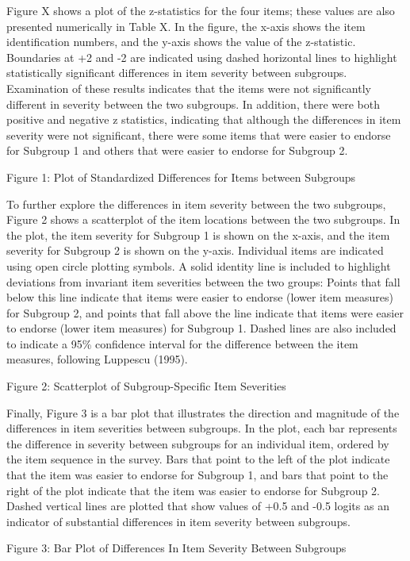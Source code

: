 \documentclass[
]{article}
\begin{document}
Figure X shows a plot of the z-statistics for the four items; these values are also presented numerically in Table X. In the figure, the x-axis shows the item identification numbers, and the y-axis shows the value of the z-statistic. Boundaries at +2 and -2 are indicated using dashed horizontal lines to highlight statistically significant differences in item severity between subgroups. Examination of these results indicates that the items were not significantly different in severity between the two subgroups. In addition, there were both positive and negative z statistics, indicating that although the differences in item severity were not significant, there were some items that were easier to endorse for Subgroup 1 and others that were easier to endorse for Subgroup 2.

Figure 1: Plot of Standardized Differences for Items between Subgroups

To further explore the differences in item severity between the two subgroups, Figure 2 shows a scatterplot of the item locations between the two subgroups. In the plot, the item severity for Subgroup 1 is shown on the x-axis, and the item severity for Subgroup 2 is shown on the y-axis. Individual items are indicated using open circle plotting symbols. A solid identity line is included to highlight deviations from invariant item severities between the two groups: Points that fall below this line indicate that items were easier to endorse (lower item measures) for Subgroup 2, and points that fall above the line indicate that items were easier to endorse (lower item measures) for Subgroup 1. Dashed lines are also included to indicate a 95\% confidence interval for the difference between the item measures, following Luppescu (1995).

Figure 2: Scatterplot of Subgroup-Specific Item Severities

Finally, Figure 3 is a bar plot that illustrates the direction and magnitude of the differences in item severities between subgroups. In the plot, each bar represents the difference in severity between subgroups for an individual item, ordered by the item sequence in the survey. Bars that point to the left of the plot indicate that the item was easier to endorse for Subgroup 1, and bars that point to the right of the plot indicate that the item was easier to endorse for Subgroup 2. Dashed vertical lines are plotted that show values of +0.5 and -0.5 logits as an indicator of substantial differences in item severity between subgroups.

Figure 3: Bar Plot of Differences In Item Severity Between Subgroups
\end{document}
